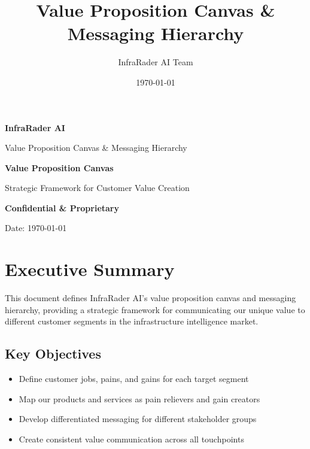 \documentclass[business]{../templates/infraradar-main}
\title{Value Proposition Canvas \& Messaging Hierarchy}
\author{InfraRader AI Team}
\date{\today}
\begin{document}
\begin{titlepage}
    \centering
    \vspace*{2cm}
    
    {\Huge\bfseries\color{infraradar@primary} InfraRader AI\par}
    \vspace{0.5cm}
    {\Large\color{infraradar@text} Value Proposition Canvas \& Messaging Hierarchy\par}
    \vspace{2cm}
    
    {\huge\bfseries Value Proposition Canvas\par}
    \vspace{1cm}
    
    {\large Strategic Framework for Customer Value Creation\par}
    \vspace{2cm}
    
    {\large\bfseries\color{infraradar@primary} Confidential \& Proprietary\par}
    {\large Date: \today\par}
    
\end{titlepage}

\tableofcontents
\newpage

\section{Executive Summary}

This document defines InfraRader AI's value proposition canvas and messaging hierarchy, providing a strategic framework for communicating our unique value to different customer segments in the infrastructure intelligence market.

\subsection{Key Objectives}
\begin{itemize}
    \item Define customer jobs, pains, and gains for each target segment
    \item Map our products and services as pain relievers and gain creators
    \item Develop differentiated messaging for different stakeholder groups
    \item Create consistent value communication across all touchpoints
\end{itemize}
\end{document}
